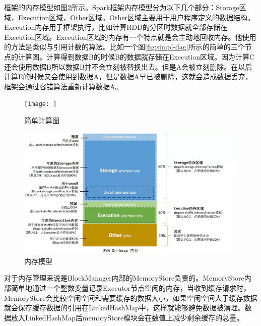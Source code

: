 框架的内存模型如图\ref{fig:memory-model}所示。Spark框架内存模型分为以下几个部分：Storage区域，Execution区域，Other区域。Other区域主要用于用户程序定义的数据结构。Execution内存用于框架执行，比如计算RDD的分区时数据就全部存储在Execution区域。Execution区域的内存有一个特点就是会主动地回收内存。他使用的方法是类似与引用计数的算法。比如一个图\ref{fig:simpl-dag}所示的简单的三个节点的计算图。计算得到数据B的时候B的数据就存储在Execution区域。因为计算C还会使用数据B所以数据B并不会立刻被替换出去。但是A会被立刻删除。在以后计算E的时候又会使用到数据A，但是数据A早已被删除，这就会造成数据丢弃，框架会通过容错算法重新计算数据A。

\begin{figure}
    \centering
    \texttt{[image: ]}
    \caption{简单计算图}
    \label{fig:memory-model}
\end{figure}

\begin{figure}
    \centering
    \includegraphics[width=0.99\textwidth]{Img/memory-model.png}
    \caption{内存模型}
    \label{fig:memory-model}
\end{figure}

对于内存管理来说是BlockManager内部的MemoryStore负责的。MemoryStore内部简单地通过一个整数变量记录Executor节点空闲的内存，当收到缓存请求时，MemoryStore会比较空闲空间和需要缓存的数据大小，如果空闲空间大于缓存数据就会保存缓存数据的引用在LinkedHashMap中，这样就能够避免数据被清理。数据放入LinkedHashMap后memoryStore模块会在数值上减少剩余缓存的总量。

